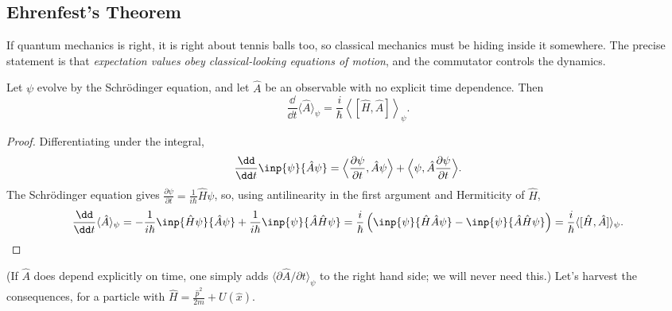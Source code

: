 \subsection{Ehrenfest's Theorem}

If quantum mechanics is right, it is right about tennis balls too, so classical mechanics must be hiding inside it somewhere. The precise statement is that \emph{expectation values obey classical-looking equations of motion}, and the commutator controls the dynamics.

\begin{theorem}
    Let $\psi$ evolve by the Schr\"odinger equation, and let $\hat{A}$ be an observable with no explicit time dependence. Then
    $$
    \frac{\dd}{\dd t} \langle \hat{A} \rangle_\psi = \frac{i}{\hbar} \left\langle [\hat{H}, \hat{A}] \right\rangle_\psi.
    $$
\end{theorem}
\begin{proof}
    Differentiating under the integral,
    $$
    \frac{\dd}{\dd t} \inp{\psi}{\hat{A} \psi} = \Big\langle \frac{\partial \psi}{\partial t}, \hat{A} \psi \Big\rangle + \Big\langle \psi, \hat{A} \frac{\partial \psi}{\partial t} \Big\rangle.
    $$
    The Schr\"odinger equation gives $\frac{\partial \psi}{\partial t} = \frac{1}{i\hbar}\hat{H}\psi$, so, using antilinearity in the first argument and Hermiticity of $\hat{H}$,
    $$
    \frac{\dd}{\dd t} \langle \hat{A} \rangle_\psi = -\frac{1}{i\hbar}\inp{\hat H \psi}{\hat{A}\psi} + \frac{1}{i \hbar} \inp{\psi}{\hat{A}\hat{H}\psi}
    = \frac{i}{\hbar} \left( \inp{\psi}{\hat H \hat A \psi} - \inp{\psi}{\hat{A}\hat{H}\psi} \right) = \frac{i}{\hbar}\langle [\hat H, \hat A] \rangle_\psi. \qedhere
    $$
\end{proof}

(If $\hat{A}$ does depend explicitly on time, one simply adds $\langle \partial \hat{A}/\partial t \rangle_\psi$ to the right hand side; we will never need this.) Let's harvest the consequences, for a particle with $\hat{H} = \frac{\hat{p}^2}{2m} + U(\hat{x})$.

